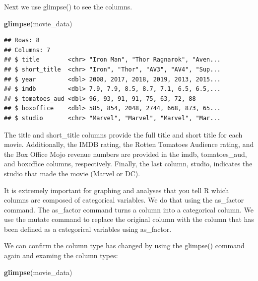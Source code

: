 \documentclass[
]{krantz}
\makeatletter
\newenvironment{Shaded}{\begin{snugshade}}{\end{snugshade}}
\newcommand{\DataTypeTok}[1]{\textcolor[rgb]{0.27,0.27,0.27}{#1}}
\newcommand{\KeywordTok}[1]{\textcolor[rgb]{0.27,0.27,0.27}{\textbf{#1}}}
\newcommand{\NormalTok}[1]{#1}
\newcommand{\OperatorTok}[1]{\textcolor[rgb]{0.43,0.43,0.43}{\textbf{#1}}}
\newcommand{\StringTok}[1]{\textcolor[rgb]{0.5,0.5,0.5}{#1}}
\newenvironment{kframe}{%
\medskip{}
\setlength{\fboxsep}{.8em}
 \def\at@end@of@kframe{}%
 \ifinner\ifhmode%
  \def\at@end@of@kframe{\end{minipage}}%
  \begin{minipage}{\columnwidth}%
 \fi\fi%
 \def\FrameCommand##1{\hskip\@totalleftmargin \hskip-\fboxsep
 \colorbox{shadecolor}{##1}\hskip-\fboxsep
     \hskip-\linewidth \hskip-\@totalleftmargin \hskip\columnwidth}%
 \MakeFramed {\advance\hsize-\width
   \@totalleftmargin\z@ \linewidth\hsize
   \@setminipage}}%
 {\par\unskip\endMakeFramed%
 \at@end@of@kframe}
\renewenvironment{Shaded}{\begin{kframe}}{\end{kframe}}
\makeatother
\begin{document}
Next we use glimpse() to see the columns.

\begin{Shaded}
\begin{Highlighting}[]
\KeywordTok{glimpse}\NormalTok{(movie_data)}
\end{Highlighting}
\end{Shaded}

\begin{verbatim}
## Rows: 8
## Columns: 7
## $ title        <chr> "Iron Man", "Thor Ragnarok", "Aven...
## $ short_title  <chr> "Iron", "Thor", "AV3", "AV4", "Sup...
## $ year         <dbl> 2008, 2017, 2018, 2019, 2013, 2015...
## $ imdb         <dbl> 7.9, 7.9, 8.5, 8.7, 7.1, 6.5, 6.5,...
## $ tomatoes_aud <dbl> 96, 93, 91, 91, 75, 63, 72, 88
## $ boxoffice    <dbl> 585, 854, 2048, 2744, 668, 873, 65...
## $ studio       <chr> "Marvel", "Marvel", "Marvel", "Mar...
\end{verbatim}

The title and short\_title columns provide the full title and short title for each movie. Additionally, the IMDB rating, the Rotten Tomatoes Audience rating, and the Box Office Mojo revenue numbers are provided in the imdb, tomatoes\_aud, and boxoffice columns, respectively. Finally, the last column, studio, indicates the studio that made the movie (Marvel or DC).

It is extremely important for graphing and analyses that you tell R which columns are composed of categorical variables. We do that using the as\_factor command. The as\_factor command turns a column into a categorical column. We use the mutate command to replace the original column with the column that has been defined as a categorical variables using as\_factor.

\begin{Shaded}
\end{Shaded}

We can confirm the column type has changed by using the glimpse() command again and examing the column types:

\begin{Shaded}
\begin{Highlighting}[]
\KeywordTok{glimpse}\NormalTok{(movie_data)}
\end{Highlighting}
\end{Shaded}
\end{document}
